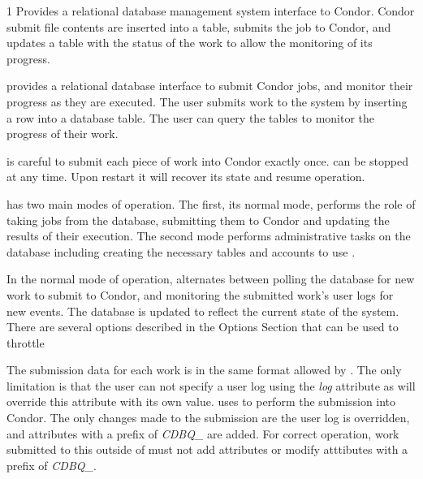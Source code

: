 \begin{ManPage}{\label{man-condor-dbq.pl}}{1}
{Provides a relational database management system interface to Condor.
Condor submit file contents are inserted into a table, 
submits the job to Condor, and updates a table with the status of the
work to allow the monitoring of its progress.}
\Synopsis






\Description
{} provides a relational database interface to submit Condor
jobs, and monitor their progress as they are executed.
The user submits work to the system by inserting a row into a database table.
The user can query the  tables to monitor the progress of their
work.

 is careful to submit each piece of work into Condor exactly
once.
 can be stopped at any time.  Upon restart it will recover its
state and resume operation.


 has two main modes of operation.  The first, its normal
mode, performs the role of taking jobs from the database, submitting them
to Condor and updating the results of their execution.
The second mode performs administrative tasks on the database including
creating the necessary tables and accounts to use .

In the normal mode of operation,  alternates between polling
the database for new work to submit to Condor, and monitoring the submitted
work's user logs for new events.
The database is updated to reflect the current state of the system.
There are several options described in the Options Section that can be used to
throttle 

The submission data for each work is in the same format allowed by
.
The only limitation is that the user can not specify a user log using the
\emph{log} attribute as  will override this attribute with
its own value.
 uses  to perform the submission into Condor.
The only changes made to the submission are the user log is overridden, and
attributes with a prefix of \emph{CDBQ\_} are added.
For correct operation, work submitted to this  outside of
 must not add attributes or modify atttibutes with a prefix of
\emph{CDBQ\_}.


\end{ManPage}

